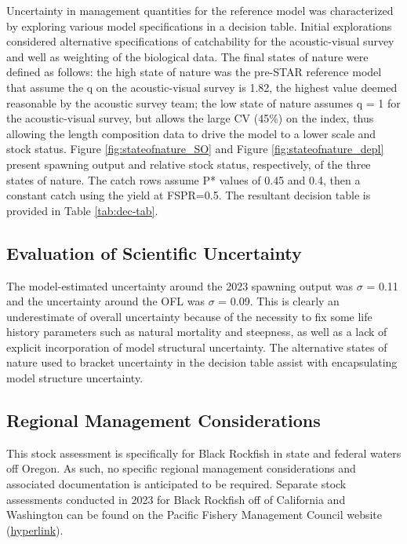\documentclass[11pt,
  english,
  letterpaper,
]{article}
\begin{document}
Uncertainty in management quantities for the reference model was characterized by exploring various model specifications in a decision table. Initial explorations considered alternative specifications of catchability for the acoustic-visual survey and well as weighting of the biological data. The final states of nature were defined as follows: the high state of nature was the pre-STAR reference model that assume the q on the acoustic-visual survey is 1.82, the highest value deemed reasonable by the acoustic survey team; the low state of nature assumes q = 1 for the acoustic-visual survey, but allows the large CV (45\%) on the index, thus allowing the length composition data to drive the model to a lower scale and stock status. Figure \ref{fig:stateofnature_SO} and Figure \ref{fig:stateofnature_depl} present spawning output and relative stock status, respectively, of the three states of nature. The catch rows assume P* values of 0.45 and 0.4, then a constant catch using the yield at FSPR=0.5. The resultant decision table is provided in Table \ref{tab:dec-tab}.

\hypertarget{evaluation-of-scientific-uncertainty}{%
\subsection{Evaluation of Scientific Uncertainty}\label{evaluation-of-scientific-uncertainty}}

The model-estimated uncertainty around the 2023 spawning output was \(\sigma\) = 0.11 and the uncertainty around the OFL was \(\sigma\) = 0.09. This is clearly an underestimate of overall uncertainty because of the necessity to fix some life history parameters such as natural mortality and steepness, as well as a lack of explicit incorporation of model structural uncertainty. The alternative states of nature used to bracket uncertainty in the decision table assist with encapsulating model structure uncertainty.

\hypertarget{regional-management-considerations}{%
\subsection{Regional Management Considerations}\label{regional-management-considerations}}

This stock assessment is specifically for Black Rockfish in state and federal waters off Oregon. As such, no specific regional management considerations and associated documentation is anticipated to be required. Separate stock assessments conducted in 2023 for Black Rockfish off of California and Washington can be found on the Pacific Fishery Management Council website (\href{https://www.pcouncil.org/stock-assessments-star-reports-stat-reports-rebuilding-analyses-terms-of-reference/groundfish-stock-assessment-documents/}{hyperlink}).
\end{document}
